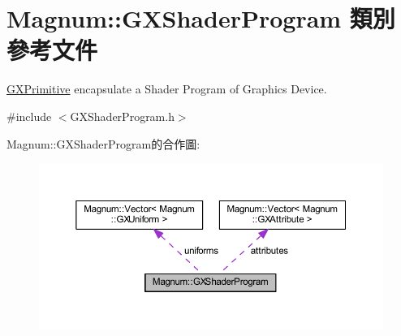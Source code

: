 \hypertarget{class_magnum_1_1_g_x_shader_program}{}\section{Magnum\+:\+:G\+X\+Shader\+Program 類別 參考文件}
\label{class_magnum_1_1_g_x_shader_program}


\hyperlink{class_magnum_1_1_g_x_primitive}{G\+X\+Primitive} encapsulate a Shader Program of Graphics Device.  




{\ttfamily \#include $<$G\+X\+Shader\+Program.\+h$>$}



Magnum\+:\+:G\+X\+Shader\+Program的合作圖\+:\nopagebreak
\begin{figure}[H]
\begin{center}
\leavevmode
\includegraphics[width=350pt]{class_magnum_1_1_g_x_shader_program__coll__graph}
\end{center}
\end{figure}
